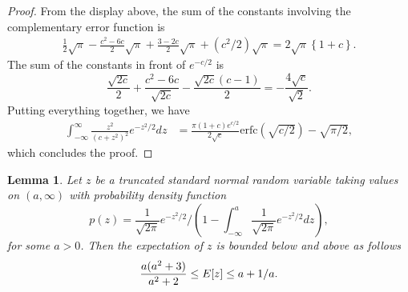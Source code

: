 \documentclass[12pt]{article}
\newtheorem{lemma}{Lemma}
\newcommand{\Exp}[1]{{\rm{E}}[ #1 ]}
\begin{document}
\begin{proof}
From the display above, the sum of the constants involving the complementary error function is
\begin{equation*}
    \begin{aligned}
        \frac{1}{2}\sqrt{\pi} - \frac{c^2-6c}{2}\sqrt{\pi} +\frac{3-2c}{2}\sqrt{\pi} + (c^2/2)\sqrt{\pi} = 2\sqrt{\pi}\left\{1+c\right\}.
    \end{aligned}
\end{equation*}
The sum of the constants in front of $e^{-c/2}$ is
\begin{equation*}
    \frac{\sqrt{2c}}{2} + \frac{c^2-6c}{\sqrt{2c}} - \frac{\sqrt{2c}(c-1)}{2} = -\frac{4\sqrt{c}}{\sqrt{2}}.
\end{equation*}
Putting everything together, we have
\begin{equation*}
\begin{aligned}
    \int_{-\infty}^\infty \frac{z^2}{(c + z^2)^{2}}e^{-z^2/2} dz &=\frac{\pi(1+c) e^{c/2}}{2\sqrt{c}} \mathrm{erfc}(\sqrt{c/2}) -\sqrt{\pi/2},
\end{aligned}
\end{equation*}
which concludes the proof.
\end{proof}

\begin{lemma}\label{lem:tnorm}
    Let $z$ be a truncated standard normal random variable taking values on $(a, \infty)$ with probability density function
    \begin{equation*}
        p(z) = \frac{1}{\sqrt{2 \pi}} e^{-z^2/2} \bigg/ \left( 1 - \int_{-\infty}^a \frac{1}{\sqrt{2 \pi}} e^{-z^2/2}dz\right),
    \end{equation*}
    for some $a > 0$.
    Then the expectation of $z$ is bounded below and above as follows
    \begin{equation*}
        \frac{a(a^2+3)}{a^2+2} \leq \Exp{z} \leq a + 1/a.
    \end{equation*}
\end{lemma}
\end{document}
